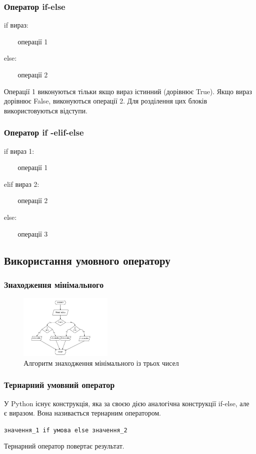 \begin{frame}
\frametitle{Оператор if-else}
\Large{if вираз:

~~~~операції 1

else:

~~~~операції 2}


\begin{flushleft}
\normalsize
Операції 1 виконуються тільки якщо вираз істинний (дорівнює True). Якщо вираз дорівнює False, виконуються операції 2. Для розділення цих блоків використовуються відступи.
\end{flushleft}
\end{frame}


\begin{frame}
\frametitle{Оператор if -elif-else}
\LARGE{if вираз 1:

~~~~операції 1

elif вираз 2:

~~~~операції 2

else:

~~~~операції 3}

\end{frame}

 \subsection{Використання умовного оператору} 
\begin{frame}
\frametitle{Знаходження мінімального}
\begin{figure}
\begin{center}
 \includegraphics[width=0.4\textwidth]{pictures/find_min.jpg}
\caption{Алгоритм знаходження мінімального із трьох чисел}
\label{find_min} 
\end{center}
\end{figure}
\end{frame}

\begin{frame}
\frametitle{Тернарний умовний оператор}
У Python існує конструкція, яка за своєю дією аналогічна конструкції if-else, але є виразом. Вона називається тернарним оператором.

\Large{\texttt{значення\_1 if умова else значення\_2}}

Тернарний оператор повертає результат.
\end{frame}

